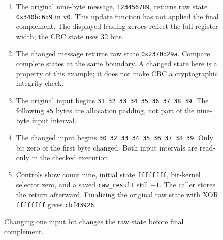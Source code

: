 \begin{figure}[htbp]
  \par\smallskip
  \begin{minipage}{\linewidth}
    \small
    \begin{enumerate}
      \setlength{\itemsep}{2pt}
            \setlength{\parsep}{0pt}
      \item The original nine-byte message, \texttt{123456789}, returns raw state \texttt{0x340bc6d9} in \texttt{v0}. This update function has not applied the final complement. The displayed leading zeroes reflect the full register width; the CRC state uses 32 bits.
      \item The changed message returns raw state \texttt{0x2370d29a}. Compare complete states at the same boundary. A changed state here is a property of this example; it does not make CRC a cryptographic integrity check.
      \item The original input begins \texttt{31 32 33 34 35 36 37 38 39}. The following \texttt{a5} bytes are allocation padding, not part of the nine-byte input interval.
      \item The changed input begins \texttt{30 32 33 34 35 36 37 38 39}. Only bit zero of the first byte changed. Both input intervals are read-only in the checked execution.
      \item Controls show count nine, initial state \texttt{ffffffff}, bit-kernel selector zero, and a saved \texttt{raw\_result} still $-1$. The caller stores the return afterward. Finalizing the original raw state with XOR \texttt{ffffffff} gives \texttt{cbf43926}.
    \end{enumerate}
  \end{minipage}
  \caption{Changing one input bit changes the raw state before final complement.}
  \label{capture:024-crc32-f01}
  \label{crc-f01}
\end{figure}
\par
